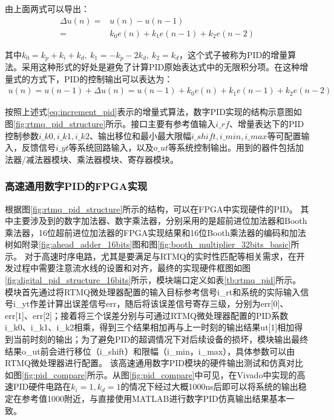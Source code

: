 由上面两式可以导出：
\begin{align}
    \Delta u(n)=&u(n)-u(n-1)\\
    =&k_0 e(n)+k_1 e(n-1)+k_2 e(n-2)
\end{align}

其中$k_0=k_p+k_i+k_d,\ k_1=-k_p-2k_d,\ k_2=k_d$，这个式子被称为PID的增量算法。采用这种形式的好处是避免了计算PID原始表达式中的无限积分项。在这种增量式的方式下，PID的控制输出可以表达为：
\begin{align}
    u(n)=u(n-1)+\Delta u(n)=u(n-1)+k_0 e(n)+k_1 e(n-1)+k_2 e(n-2)\label{eq:increment_pid}
\end{align}

按照上述式\eqref{eq:increment_pid}表示的增量式算法，数字PID实现的结构示意图如图\ref{fig:rtmq_pid_structure}所示。接口主要有参考值输入$i\_rf$、增量表达下的PID控制参数$i\_k0, i\_k1, i\_k2$、输出移位和最小最大限幅$i\_shift, i\_min, i\_max$等可配置输入，反馈信号$i\_yt$等系统回路输入，以及$o\_ut$等系统控制输出。用到的器件包括加法器/减法器模块、乘法器模块、寄存器模块。


\subsubsection[高速通用数字PID的FPGA实现]{高速通用数字PID的FPGA实现}


根据图\ref{fig:rtmq_pid_structure}所示的结构，可以在FPGA中实现硬件的PID。
其中主要涉及到的数字加法器、数字乘法器，分别采用的是超前进位加法器和Booth乘法器，16位超前进位加法器的FPGA实现结果和16位Booth乘法器的编码和加法树如附录\ref{fig:ahead_adder_16bits}图和图\ref{fig:booth_multiplier_32bits_basic}所示。
对于高速时序电路，尤其是要满足与RTMQ的实时性匹配等相关需求，在开发过程中需要注意流水线的设置和对齐，最终的实现硬件框图如图\ref{fig:digital_pid_structure_16bits}所示，模块端口定义如表\ref{tb:rtmq_pid}所示。
模块首先通过将RTMQ微处理器配置的输入目标参考信号i\_rt和系统的实际输入信号i\_yt作差计算出误差信号err，随后将该误差信号寄存三级，分别为err[0]、err[1]、err[2]；接着将三个误差分别与可通过RTMQ微处理器配置的PID系数i\_k0、i\_k1、i\_k2相乘，得到三个结果相加再与上一时刻的输出结果ut[1]相加得到当前时刻的输出；为了避免PID的超调情况下对后续设备的损坏，模块输出最终结果o\_ut前会进行移位（i\_shift）和限幅（i\_min，i\_max），具体参数可以由RTMQ微处理器进行配置。
该高速通用数字PID模块的硬件输出测试和仿真对比如图\ref{fig:pid_compare}所示。从图\ref{fig:pid_compare}中可见，在Vivado中实现的高速PID硬件电路在$k_i=1, k_d=1$的情况下经过大概1000ns后即可以将系统的输出稳定在参考值1000附近，与直接使用MATLAB进行数字PID仿真输出结果基本一致。

